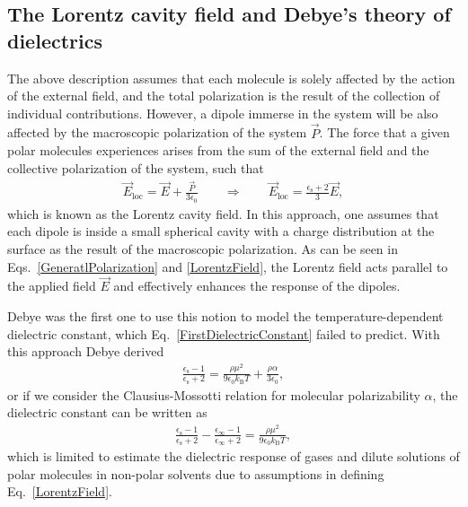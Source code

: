 \subsection{The Lorentz cavity field and Debye's theory of dielectrics}



The above description assumes that each molecule is solely affected by the action of the external field, and the total polarization is the result of the collection of individual contributions. However, a dipole immerse in the system will be also affected by the macroscopic polarization of the system $\vec{P}$. The force that a given polar molecules experiences arises from the sum of the external field and the collective polarization of the system, such that 
\begin{eqnarray}
\vec{E}_\text{loc} = \vec{E} + \frac{\vec{P}}{3 \epsilon_0} \qquad \Longrightarrow \qquad \vec{E}_\text{loc} = \frac{\epsilon_\text{s} + 2}{3} \vec{E},
\label{LorentzField}
\end{eqnarray} 
which is known as the Lorentz cavity field.\!\cite{Lorentz1916} In this approach, one assumes that each dipole is inside a small spherical cavity with a charge distribution at the surface as the result of the macroscopic polarization. As can be seen in Eqs.\ \ref{GeneratlPolarization} and \ref{LorentzField}, the Lorentz field acts parallel to the applied field $\vec{E}$ and effectively enhances the response of the dipoles. 



Debye was the first one to use this notion to model the temperature-dependent dielectric constant, which Eq.\ \ref{FirstDielectricConstant} failed to predict. With this approach Debye derived
\begin{eqnarray}
\frac{\epsilon_\text{s} - 1}{\epsilon_\text{s} + 2} = \frac{\rho \mu^2}{9 \epsilon_0 k_\text{B} T} + \frac{\rho \alpha}{3 \epsilon_0},
\label{DebyeDielectricConstant}
\end{eqnarray} 
or if we consider the Clausius-Mossotti relation for molecular polarizability $\alpha$,\!\cite{choy1999effective} the dielectric constant can be written as
\begin{eqnarray}
\frac{\epsilon_\text{s} - 1}{\epsilon_\text{s} + 2} - \frac{\epsilon_\infty - 1}{\epsilon_\infty + 2} = \frac{\rho \mu^2}{9 \epsilon_0 k_\text{B} T},
\label{DebyeDielectricConstant2}
\end{eqnarray} 
which is limited to estimate the dielectric response of gases and dilute solutions of polar molecules in non-polar solvents due to assumptions in defining Eq.\ \ref{LorentzField}. %



